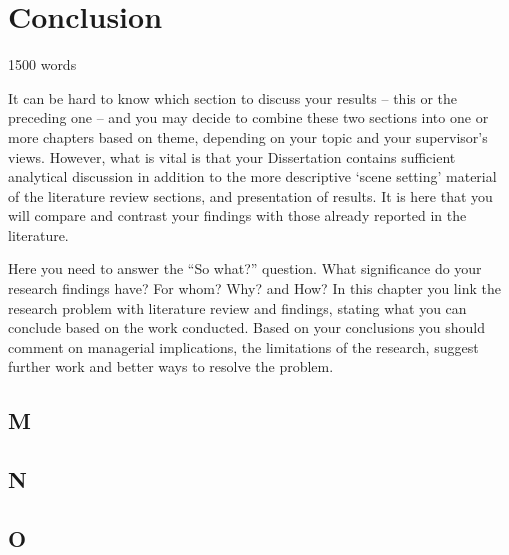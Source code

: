 \chapter{Conclusion}\label{ch:conclusion}

1500 words

It can be hard to know which section to discuss your results – this or the preceding one – and you may decide to combine
these two sections into one or more chapters based on theme, depending on your topic and your supervisor’s views.
However, what is vital is that your Dissertation contains sufficient analytical discussion in addition to the more descriptive ‘scene setting’
material of the literature review sections, and presentation of results.
It is here that you will compare and contrast your findings with those already reported in the literature.

Here you need to answer the “So what?” question.
What significance do your research findings have?
For whom?
Why?
and How?
In this chapter you link the research problem with literature review and findings, stating what you can conclude based on the work conducted.
Based on your conclusions you should comment on managerial implications, the limitations of the research, suggest further work and better ways to resolve the problem.

\section{M}\label{sec:M}
\lipsum[1]

\section{N}\label{sec:N}
\lipsum[1]

\section{O}\label{sec:O}
\lipsum[1]